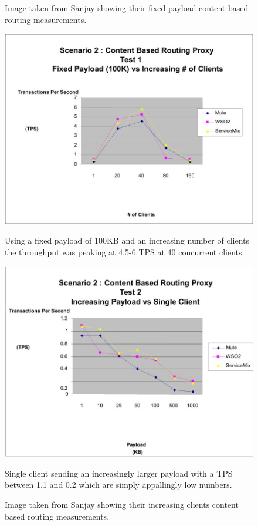 \newpage
\begin{figure}[H]
	\caption{Image taken from Sanjay \cite{Sanjay2011} showing their fixed payload content based routing measurements.}
	\centerline{\includegraphics[scale=0.43]{img/Sanjay_cbr_fixed_payload}}
	\label{fig:sanjay_cbr_fixed_payload}
	Using a fixed payload of 100KB and an increasing number of clients the throughput was peaking at 4.5-6 TPS at 40 concurrent clients.

	\caption{Image taken from Sanjay \cite{Sanjay2011} showing their increasing clients content based routing measurements.}
	\centerline{\includegraphics[scale=0.43]{img/Sanjay_cbr_increasing_payload}}
	\label{fig:sanjay_cbr_increasing_payload}
	Single client sending an increasingly larger payload with a TPS between 1.1 and 0.2 which are simply appallingly low numbers.
\end{figure}

